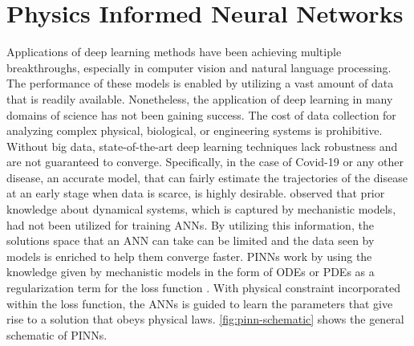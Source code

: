 \section{Physics Informed Neural Networks}
\label{sec:literature-review-physics-informed-neural-network}

Applications of deep learning methods have been achieving multiple breakthroughs, especially in computer vision and natural language processing.
The performance of these models is enabled by utilizing a vast amount of data that is readily available.
Nonetheless, the application of deep learning in many domains of science has not been gaining success.
The cost of data collection for analyzing complex physical, biological, or engineering systems is prohibitive.
Without big data, state-of-the-art deep learning techniques lack robustness and are not guaranteed to converge.
Specifically, in the case of Covid-19 or any other disease, an accurate model, that can fairly estimate the trajectories of the disease at an early stage when data is scarce, is highly desirable.
\citeauthor{raissiPhysicsinformedNeuralNetworks2019} \cite{raissiPhysicsinformedNeuralNetworks2019} observed that prior knowledge about dynamical systems, which is captured by mechanistic models, had not been utilized for training \glspl{ANN}.
By utilizing this information, the solutions space that an \gls{ANN} can take can be limited and the data seen by models is enriched to help them converge faster.
\glspl{PINN} work by using the knowledge given by mechanistic models in the form of \glspl{ODE} or \glspl{PDE} as a regularization term for the loss function \cite{raissiPhysicsinformedNeuralNetworks2019, lagarisArtificialNeuralNetworks1998}.
With physical constraint incorporated within the loss function, the \glspl{ANN} is guided to learn the parameters that give rise to a solution that obeys physical laws.
\autoref{fig:pinn-schematic} shows the general schematic of \glspl{PINN}.

